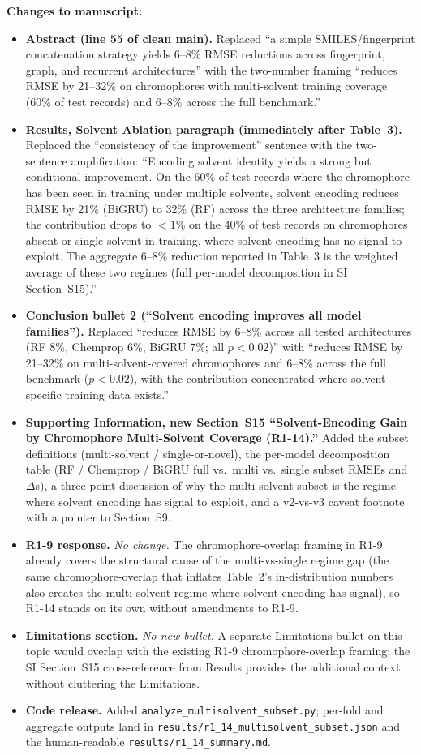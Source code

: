 \documentclass[11pt]{article}
\newenvironment{changes}{%
  \noindent\textbf{Changes to manuscript:}
  \begin{itemize}[leftmargin=2em,itemsep=2pt]}{%
  \end{itemize}\medskip}
\begin{document}
\begin{changes}
  \item \textbf{Abstract (line 55 of clean main).} Replaced ``a simple SMILES/fingerprint concatenation strategy yields 6--8\% RMSE reductions across fingerprint, graph, and recurrent architectures'' with the two-number framing ``reduces RMSE by 21--32\% on chromophores with multi-solvent training coverage (60\% of test records) and 6--8\% across the full benchmark.''
  \item \textbf{Results, Solvent Ablation paragraph (immediately after Table~3).} Replaced the ``consistency of the improvement'' sentence with the two-sentence amplification: ``Encoding solvent identity yields a strong but conditional improvement. On the 60\% of test records where the chromophore has been seen in training under multiple solvents, solvent encoding reduces RMSE by 21\% (BiGRU) to 32\% (RF) across the three architecture families; the contribution drops to $<1$\% on the 40\% of test records on chromophores absent or single-solvent in training, where solvent encoding has no signal to exploit. The aggregate 6--8\% reduction reported in Table~3 is the weighted average of these two regimes (full per-model decomposition in SI Section~S15).''
  \item \textbf{Conclusion bullet 2 (``Solvent encoding improves all model families'').} Replaced ``reduces RMSE by 6--8\% across all tested architectures (RF 8\%, Chemprop 6\%, BiGRU 7\%; all $p < 0.02$)'' with ``reduces RMSE by 21--32\% on multi-solvent-covered chromophores and 6--8\% across the full benchmark ($p < 0.02$), with the contribution concentrated where solvent-specific training data exists.''
  \item \textbf{Supporting Information, new Section~S15 ``Solvent-Encoding Gain by Chromophore Multi-Solvent Coverage (R1-14).''} Added the subset definitions (multi-solvent / single-or-novel), the per-model decomposition table (RF / Chemprop / BiGRU full vs.\ multi vs.\ single subset RMSEs and $\Delta$s), a three-point discussion of why the multi-solvent subset is the regime where solvent encoding has signal to exploit, and a v2-vs-v3 caveat footnote with a pointer to Section~S9.
  \item \textbf{R1-9 response.} \emph{No change.} The chromophore-overlap framing in R1-9 already covers the structural cause of the multi-vs-single regime gap (the same chromophore-overlap that inflates Table~2's in-distribution numbers also creates the multi-solvent regime where solvent encoding has signal), so R1-14 stands on its own without amendments to R1-9.
  \item \textbf{Limitations section.} \emph{No new bullet.} A separate Limitations bullet on this topic would overlap with the existing R1-9 chromophore-overlap framing; the SI Section~S15 cross-reference from Results provides the additional context without cluttering the Limitations.
  \item \textbf{Code release.} Added \texttt{analyze\_multisolvent\_subset.py}; per-fold and aggregate outputs land in \texttt{results/r1\_14\_multisolvent\_subset.json} and the human-readable \texttt{results/r1\_14\_summary.md}.
\end{changes}
\end{document}
